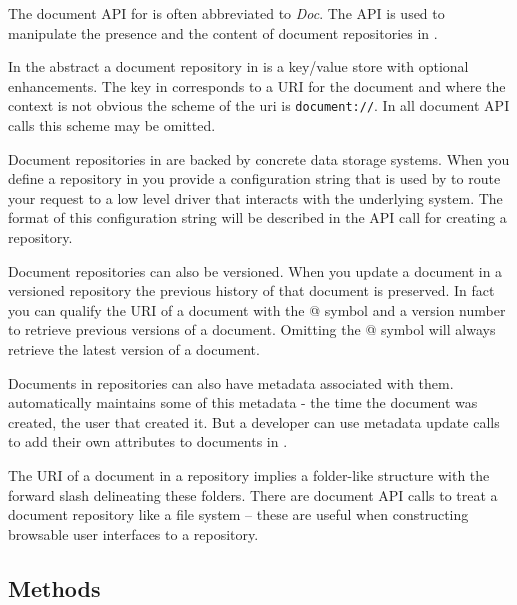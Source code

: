 
The document API for \Rapture is often abbreviated to \emph{Doc}. The API is used
to manipulate the presence and the content of document repositories in \Rapture.

In the abstract a document repository in \Rapture is a key/value store with optional
enhancements. The key in \Rapture corresponds to a URI for the document and where the
context is not obvious the scheme of the uri is \verb+document://+. In all document
API calls this scheme may be omitted.

Document repositories in \Rapture are backed by concrete data storage systems. When
you define a repository in \Rapture you provide a configuration string that is used
by \Rapture to route your request to a low level driver that interacts with the
underlying system. The format of this configuration string will be described in
the API call for creating a repository.

Document repositories can also be versioned. When you update a document in a
versioned repository the previous history of that document is preserved. In fact you can
qualify the URI of a document with the @ symbol and a version number to retrieve
previous versions of a document. Omitting the @ symbol will always retrieve the
latest version of a document.

Documents in repositories can also have metadata associated with them. \Rapture
automatically maintains some of this metadata - the time the document was created, the
user that created it. But a developer can use metadata update calls to add their
own attributes to documents in \Rapture.

The URI of a document in a repository implies a folder-like structure with the
forward slash delineating these folders. There are document API calls to treat a
document repository like a file system -- these are useful when constructing
browsable user interfaces to a repository.

\subsection{Methods}
